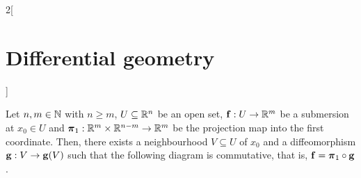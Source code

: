 \documentclass[../../../main_math.tex]{subfiles}
\begin{document}
\begin{multicols}{2}[\section{Differential geometry}]
\begin{theorem}
\begin{center}
    \end{center}
  \end{theorem}
  \begin{theorem}
    Let $n,m\in\mathbb{N}$ with $n\geq m$, $U\subseteq\mathbb{R}^n$ be an open set, $\boldsymbol{\mathrm{f}}:U\rightarrow \mathbb{R}^m$ be a submersion at $x_0\in U$ and $\boldsymbol{\mathrm{\pi}}_1:\mathbb{R}^m\times\mathbb{R}^{n-m}\rightarrow\mathbb{R}^m$ be the projection map into the first coordinate. Then, there exists a neighbourhood $V\subseteq U$ of $x_0$ and a diffeomorphism $\boldsymbol{\mathrm{g}}:V\rightarrow \boldsymbol{\mathrm{g}}(V)$ such that the following diagram is commutative, that is, $\boldsymbol{\mathrm{f}}=\boldsymbol{\mathrm{\pi}}_1\circ\boldsymbol{\mathrm{g}}$.
    \begin{center}
      \begin{minipage}{\linewidth}
        \centering
        
      \end{minipage}
    \end{center}
  \end{theorem}

\end{multicols}
\end{document}
